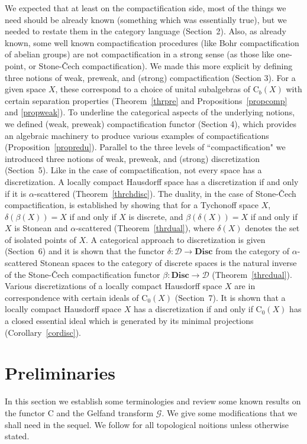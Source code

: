 \documentclass[manuscript]{amsart}
\theoremstyle{definition}
\begin{document}
We expected that at least on the compactification side, most of the things we need should be already known (something which was essentially true), but we needed to restate them in the category language (Section~2). Also, as already known, some well known compactification procedures (like Bohr compactification of abelian groups) are not compactification in a strong sense (as those like one-point, or Stone-\v{C}ech compactification). We made this more explicit by defining three notions of weak, preweak, and (strong) compactification (Section 3). For a given space $X$, these correspond to a choice of unital subalgebras of $\mathrm{C}_{b}(X)$ with certain separation properties (Theorem~\ref{thrpre} and
Propositions~\ref{propcomp} and \ref{propweak}). To underline the categorical aspects of the underlying notions, we defined (weak, preweak) compactification functor (Section 4), which provides an algebraic machinery to produce various examples of compactifications (Proposition~\ref{propredu}). Parallel to the three levels of ``compactification" we introduced three notions of  weak, preweak, and (strong) discretization (Section~5). Like in the case of compactification, not every space has a discretization. A locally compact Hausdorff space
 has a discretization
if and only if
it is $\alpha$-scattered (Theorem~\ref{thrchdisc}). The duality, in the case of Stone-\v{C}ech compactification, is established by showing that
for a Tychonoff space $X$,
 $\delta(\beta(X))=X$ if and only if $X$ is discrete, and
$\beta(\delta(X))=X$ if and only if $X$ is
 Stonean and $\alpha$-scattered (Theorem~\ref{thrdual}), where
 $\delta (X)$ denotes the set of isolated points of $X$. A categorical approach to discretization is given (Section~6) and it is shown that the functor
$\delta :\mathcal{D}\to  \mathbf{Disc}$
from the category of $\alpha$-scattered  Stonean spaces
to the category of discrete spaces is the natural inverse of the
Stone-\v{C}ech compactification functor $\beta :\mathbf{Disc}\to \mathcal{D}$
(Theorem~\ref{thrcdual}). Various discretizations of a locally compact Hausdorff
space $X$ are in correspondence with certain ideals of $\mathrm{C}_{0}(X)$ (Section~7).
It is shown that  a locally compact Hausdorff space
$X$ has a discretization if and only if
$\mathrm{C}_{0}(X)$ has a closed essential ideal which is generated by
its minimal projections (Corollary~\ref{cordisc}).

\section{Preliminaries}
\noindent
In this section we establish some terminologies and review some known results on
the functor $\mathrm{C}$ and the Gelfand transform $\mathcal{G}$. We give
some modifications that we shall need in the sequel. We follow
\cite{en89} for  all topological noitions unless otherwise stated.
\end{document}
